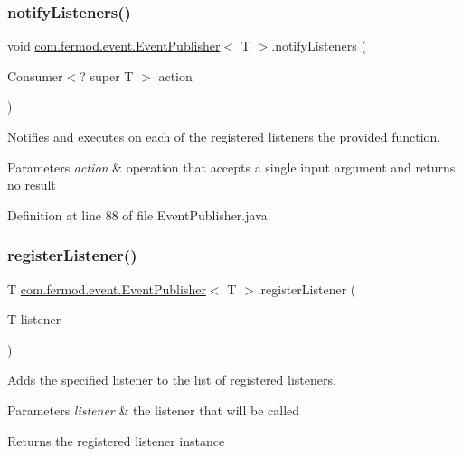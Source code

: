 \subsubsection{\texorpdfstring{notifyListeners()}{notifyListeners()}}
{\footnotesize\ttfamily void \mbox{\hyperlink{a00022}{com.\+fermod.\+event.\+Event\+Publisher}}$<$ T $>$.notify\+Listeners (\begin{DoxyParamCaption}\item[{Consumer$<$? super T $>$}]{action }\end{DoxyParamCaption})}



Notifies and executes on each of the registered listeners the provided function. 


\begin{DoxyParams}{Parameters}
{\em action} & operation that accepts a single input argument and returns no result \\
\hline
\end{DoxyParams}


Definition at line 88 of file Event\+Publisher.\+java.

\mbox{\label{a00022_ad4ab74518bb83dede43fa2be3a38e8cd}} 
\subsubsection{\texorpdfstring{registerListener()}{registerListener()}}
{\footnotesize\ttfamily T \mbox{\hyperlink{a00022}{com.\+fermod.\+event.\+Event\+Publisher}}$<$ T $>$.register\+Listener (\begin{DoxyParamCaption}\item[{T}]{listener }\end{DoxyParamCaption})}



Adds the specified listener to the list of registered listeners. 


\begin{DoxyParams}{Parameters}
{\em listener} & the listener that will be called \\
\hline
\end{DoxyParams}
\begin{DoxyReturn}{Returns}
the registered listener instance 
\end{DoxyReturn}


